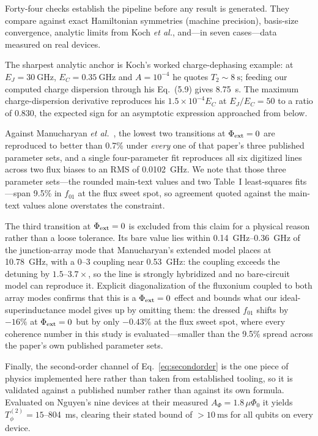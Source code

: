 \documentclass[journal]{IEEEtran}
\begin{document}
Forty-four checks establish the pipeline before any result is generated. They compare
against exact Hamiltonian symmetries (machine precision), basis-size convergence, analytic
limits from Koch \emph{et al.}, and---in seven cases---data measured on real devices.

The sharpest analytic anchor is Koch's worked charge-dephasing example: at
$E_J = \SI{30}{\giga\hertz}$, $E_C = \SI{0.35}{\giga\hertz}$ and $A = 10^{-4}$ he quotes
$T_2 \sim \SI{8}{\second}$; feeding our computed charge dispersion through his Eq.~(5.9)
gives \SI{8.75}{\second}. The maximum charge-dispersion derivative reproduces his
$1.5\times10^{-4}E_C$ at $E_J/E_C = 50$ to a ratio of $0.830$, the expected sign for an
asymptotic expression approached from below.

Against Manucharyan \emph{et al.}~\cite{manucharyan2009}, the lowest two transitions at
$\Phi_{\rm ext} = 0$ are reproduced to better than 0.7\% under \emph{every} one of that
paper's three published parameter sets, and a single four-parameter fit reproduces all six
digitized lines across two flux biases to an RMS of \SI{0.0102}{\giga\hertz}. We note that
those three parameter sets---the rounded main-text values and two Table~I least-squares
fits---span 9.5\% in $f_{01}$ at the flux sweet spot, so agreement quoted against the
main-text values alone overstates the constraint.

The third transition at $\Phi_{\rm ext} = 0$ is excluded from this claim for a physical
reason rather than a loose tolerance. Its bare value lies within \SIrange{0.14}{0.36}{\giga\hertz}
of the junction-array mode that Manucharyan's extended model places at
\SI{10.78}{\giga\hertz}, with a $0$--$3$ coupling near \SI{0.53}{\giga\hertz}: the coupling
exceeds the detuning by $1.5$--$3.7\times$, so the line is strongly hybridized and no
bare-circuit model can reproduce it. Explicit diagonalization of the fluxonium coupled to
both array modes confirms that this is a $\Phi_{\rm ext} = 0$ effect and bounds what our
ideal-superinductance model gives up by omitting them: the dressed $f_{01}$ shifts by $-16\%$
at $\Phi_{\rm ext} = 0$ but by only $-0.43\%$ at the flux sweet spot, where every coherence
number in this study is evaluated---smaller than the 9.5\% spread across the paper's own
published parameter sets.

Finally, the second-order channel of Eq.~\eqref{eq:secondorder} is the one piece of physics
implemented here rather than taken from established tooling, so it is validated against a
published number rather than against its own formula. Evaluated on Nguyen's nine devices at
their measured $A_\Phi = 1.8\,\mu\Phi_0$ it yields $T_\phi^{(2)} = 15$--\SI{804}{\milli\second},
clearing their stated bound of $>\SI{10}{\milli\second}$ for all qubits on every device.
\end{document}
